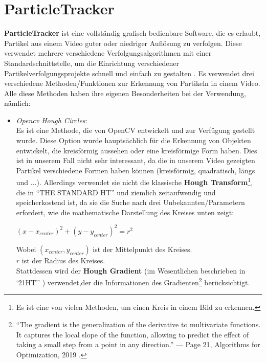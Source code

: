 \section{ParticleTracker \label{kap1_ParticleTracker}}
\textbf{ParticleTracker} ist eine vollständig grafisch bedienbare Software, die es erlaubt, Partikel aus einem Video guter oder niedriger Auflösung zu verfolgen. Diese verwendet mehrere verschiedene Verfolgungsalgorithmen mit einer Standardschnittstelle, um die Einrichtung verschiedener Partikelverfolgungsprojekte schnell und einfach zu gestalten \cite{Smith2021}.
Es verwendet drei verschiedene Methoden/Funktionen zur Erkennung von Partikeln in einem Video. Alle diese Methoden haben ihre eigenen Besonderheiten bei der Verwendung, nämlich:
\begin{itemize}
   \item \textit{Opencv Hough Circles}:\\ Es ist eine Methode, die von OpenCV\cite{opencv_library} entwickelt und zur Verfügung gestellt wurde. Diese Option wurde hauptsächlich für die Erkennung von Objekten entwickelt, die kreisförmig aussehen oder eine kreisförmige Form haben. Dies ist in unserem Fall nicht sehr interessant, da die in unserem Video gezeigten Partikel verschiedene Formen haben können (kreisförmig, quadratisch, längs und ...). Allerdings verwendet sie nicht die klassische \textbf{Hough Transform}\footnote{Es ist eine von vielen Methoden, um einen Kreis in einem Bild zu erkennen.}, die in ``THE STANDARD HT'' \cite{comparative_hough_transform} und ziemlich zeitaufwendig und speicherkostend ist, da sie die Suche nach drei Unbekannten/Parametern erfordert, wie die mathematische Darstellung des Kreises unten zeigt:\\
\begin{center}
 $ (x- x_{center})^{2} + (y - y_{center})^{2} = r^{2}$ \\
\end{center}
Wobei $(x_{center},y_{center})$ ist der Mittelpunkt des Kreises.\\
      $r$ ist der Radius des Kreises.\\
      

Stattdessen wird der \textbf{Hough Gradient} (im Wesentlichen beschrieben in `21HT'' \cite{comparative_hough_transform}) verwendet,der die Informationen des Gradienten\footnote{``The gradient is the generalization of the derivative to multivariate functions. It captures the local slope of the function, allowing to predict the effect of taking a small step from a point in any direction.'' — Page 21, Algorithms for Optimization, 2019 \cite{algo_optimi_2019}.} berücksichtigt.
      

\end{itemize}
